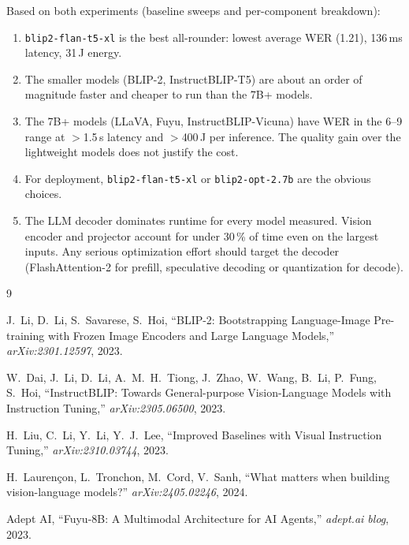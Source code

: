 \documentclass[12pt,a4paper]{article}
\begin{document}
Based on both experiments (baseline sweeps and per-component breakdown):
\begin{enumerate}[nosep]
  \item \texttt{blip2-flan-t5-xl} is the best all-rounder: lowest average WER (1.21), 136\,ms latency, 31\,J energy.
  \item The smaller models (BLIP-2, InstructBLIP-T5) are about an order of magnitude faster and cheaper to run than the 7B+ models.
  \item The 7B+ models (LLaVA, Fuyu, InstructBLIP-Vicuna) have WER in the 6--9 range at $>$1.5\,s latency and $>$400\,J per inference.  The quality gain over the lightweight models does not justify the cost.
  \item For deployment, \texttt{blip2-flan-t5-xl} or \texttt{blip2-opt-2.7b} are the obvious choices.
  \item The LLM decoder dominates runtime for every model measured.  Vision encoder and projector account for under 30\,\% of time even on the largest inputs.  Any serious optimization effort should target the decoder (FlashAttention-2 for prefill, speculative decoding or quantization for decode).
\end{enumerate}

\begin{thebibliography}{9}

J.~Li, D.~Li, S.~Savarese, S.~Hoi,
``BLIP-2: Bootstrapping Language-Image Pre-training with Frozen Image Encoders and Large Language Models,''
\textit{arXiv:2301.12597}, 2023.

W.~Dai, J.~Li, D.~Li, A.~M.~H.~Tiong, J.~Zhao, W.~Wang, B.~Li, P.~Fung, S.~Hoi,
``InstructBLIP: Towards General-purpose Vision-Language Models with Instruction Tuning,''
\textit{arXiv:2305.06500}, 2023.

H.~Liu, C.~Li, Y.~Li, Y.~J.~Lee,
``Improved Baselines with Visual Instruction Tuning,''
\textit{arXiv:2310.03744}, 2023.

H.~Laurençon, L.~Tronchon, M.~Cord, V.~Sanh,
``What matters when building vision-language models?''
\textit{arXiv:2405.02246}, 2024.

Adept AI,
``Fuyu-8B: A Multimodal Architecture for AI Agents,''
\textit{adept.ai blog}, 2023.

\end{thebibliography}
\end{document}
